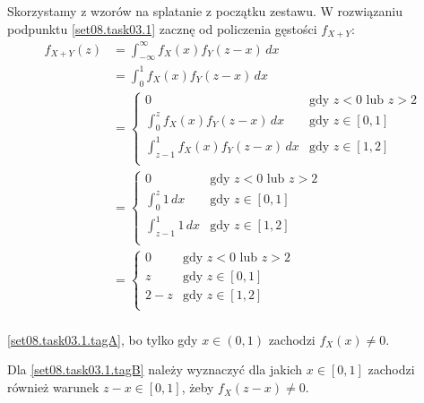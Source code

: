 Skorzystamy z wzorów na splatanie z początku zestawu.
W rozwiązaniu podpunktu \ref{set08.task03.1} zacznę od policzenia gęstości \(f_{X+Y}\):
\begin{align*}
	f_{X+Y}(z)
	 & = \int_{-\infty}^{\infty} f_X(x) f_Y(z-x) \, dx            \\
	 & = \int_{0}^{1} f_X(x) f_Y(z-x) \, dx
	\tag{1}\label{set08.task03.1.tagA}                            \\
	 & = \begin{cases}
		     0
		      & \text{gdy \(z < 0\) lub \(z > 2\)} \\
		     \int_{0}^{z} f_X(x) f_Y(z-x) \, dx
		      & \text{gdy \(z \in [0, 1]\)}        \\
		     \int_{z-1}^{1} f_X(x) f_Y(z-x) \, dx
		      & \text{gdy \(z \in [1, 2]\)}        \\
	     \end{cases}
	\tag{2}\label{set08.task03.1.tagB}                            \\
	 & = \begin{cases}
		     0
		      & \text{gdy \(z < 0\) lub \(z > 2\)} \\
		     \int_{0}^{z} 1 \, dx
		      & \text{gdy \(z \in [0, 1]\)}        \\
		     \int_{z-1}^{1} 1 \, dx
		      & \text{gdy \(z \in [1, 2]\)}        \\
	     \end{cases}        \\
	 & = \boxed{\begin{cases}
			            0
			             & \text{gdy \(z < 0\) lub \(z > 2\)} \\
			            z
			             & \text{gdy \(z \in [0, 1]\)}        \\
			            2 - z
			             & \text{gdy \(z \in [1, 2]\)}        \\
		            \end{cases}} \\
\end{align*}

\eqref{set08.task03.1.tagA}, bo tylko gdy \(x \in (0, 1)\) zachodzi \(f_X(x) \neq 0\).

Dla \eqref{set08.task03.1.tagB} należy wyznaczyć dla jakich \(x \in [0, 1]\) zachodzi
również warunek \(z-x \in [0, 1]\), żeby \(f_X(z-x) \neq 0\).

